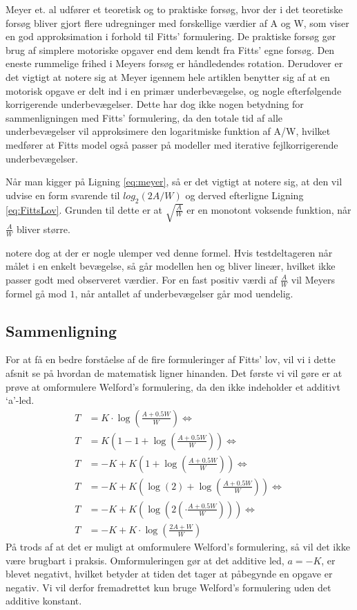 Meyer et. al udfører et teoretisk og to praktiske forsøg, hvor der i det teoretiske forsøg bliver gjort flere udregninger med forskellige værdier af A og W, som viser en god approksimation i forhold til Fitts' formulering. De praktiske forsøg gør brug af simplere motoriske opgaver end dem kendt fra Fitts' egne forsøg. Den eneste rummelige frihed i Meyers forsøg er håndledendes rotation. Derudover er det vigtigt at notere sig at Meyer igennem hele artiklen benytter sig af at en motorisk opgave er delt ind i en primær underbevægelse, og nogle efterfølgende korrigerende underbevægelser. Dette har dog ikke nogen betydning for sammenligningen med Fitts’ formulering, da den totale tid af alle underbevægelser vil approksimere den logaritmiske funktion af A/W, hvilket medfører at Fitts model også passer på modeller med iterative fejlkorrigerende underbevægelser.

Når man kigger på Ligning \ref{eq:meyer}, så er det vigtigt at notere sig, at den vil udvise en form svarende til $log_2(2A/W)$ og derved efterligne Ligning \ref{eq:FittsLov}. Grunden til dette er at $\sqrt{\frac{A}{W}}$ er en monotont voksende funktion, når $\frac{A}{W}$ bliver større. 

\cite{goldberg2015} notere dog at der er nogle ulemper ved denne formel. Hvis testdeltageren når målet i en enkelt bevægelse, så går modellen hen og bliver lineær, hvilket ikke passer godt med observeret værdier. For en fast positiv værdi af $\frac{A}{W}$ vil Meyers formel gå mod $1$, når antallet af underbevægelser går mod uendelig.

\subsection*{Sammenligning}
For at få en bedre forståelse af de fire formuleringer af Fitts' lov, vil vi i dette afsnit se på hvordan de matematisk ligner hinanden. Det første vi vil gøre er at prøve at omformulere Welford's formulering, da den ikke indeholder et additivt `a'-led. 
\begin{align*}
T &= K\cdot\log\left(\frac{A+0.5W}{W}\right)\Leftrightarrow\\
T &= K\left(1-1+\log\left(\frac{A+0.5W}{W}\right)\right)\Leftrightarrow\\
T &= -K+K\left(1+\log\left(\frac{A+0.5W}{W}\right)\right)\Leftrightarrow\\
T &= -K+K\left(\log(2)+\log\left(\frac{A+0.5W}{W}\right)\right)\Leftrightarrow\\
T &= -K+K\left(\log\left(2\left(\cdot\frac{A+0.5W}{W}\right)\right)\right)\Leftrightarrow\\
T &= -K+K\cdot\log\left(\frac{2A+W}{W}\right)
\end{align*}
På trods af at det er muligt at omformulere Welford's formulering, så vil det ikke være brugbart i praksis. Omformuleringen gør at det additive led, $a = -K$, er blevet negativt, hvilket betyder at tiden det tager at påbegynde en opgave er negativ. Vi vil derfor fremadrettet kun bruge Welford's formulering uden det additive konstant.

